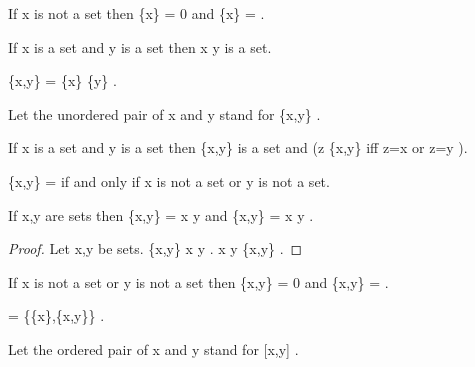 \documentclass[a4paper,draft]{amsproc}
\begin{document}
\begin{forthel}
\begin{theorem}
If  x  is not a set then  \bigcap \{x\} = 0 
and  \bigcup \{x\} =  .
\end{theorem}

\begin{axiom}
If  x  is a set and  y  is a set then  x \cup y  is a set.
\end{axiom}

\begin{definition}  \{x,y\} = \{x\} \cup \{y\} .\end{definition}
Let the unordered pair of  x  and  y  stand for  \{x,y\} .


\begin{theorem}
If  x  is a set and  y  is a set 
then  \{x,y\}  is a set and  (z \in \{x,y\}  iff  z=x  or  z=y ). 
\end{theorem}

\begin{theorem}
 \{x,y\} =   if and only if  x  is not a set or  y  is not a set.
\end{theorem}

\begin{theorem}
If  x,y  are sets then  \bigcap \{x,y\} = x \cap y 
and  \bigcup \{x,y\} = x \cup y .
\end{theorem}
\begin{proof}
Let  x,y  be sets.
 \bigcup \{x,y\} \subset x \cup y .
 x \cup y \subset \bigcup \{x,y\} .
\end{proof}

\begin{theorem}
If  x  is not a set or  y  is not a set then
 \bigcap \{x,y\} = 0  and  \bigcup \{x,y\} =  .
\end{theorem}


\begin{definition}  [x,y] = \{\{x\},\{x,y\}\} .\end{definition}
Let the ordered pair of  x  and  y  stand for  [x,y] .


\end{forthel}
\end{document}
